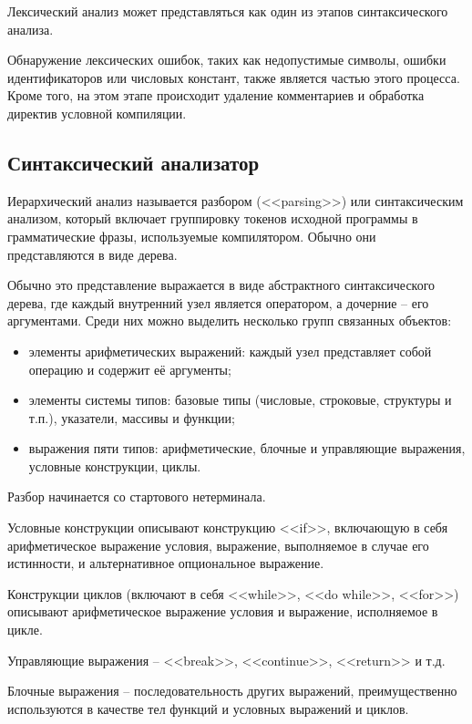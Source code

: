 Лексический анализ может представляться как один из этапов синтаксического анализа. 

Обнаружение лексических ошибок, таких как недопустимые символы, ошибки идентификаторов или числовых констант, также является частью этого процесса. Кроме того, на этом этапе происходит удаление комментариев и обработка директив условной компиляции. \\

\subsection{Синтаксический анализатор}
Иерархический анализ называется разбором (<<parsing>>) или синтаксическим анализом, который включает группировку токенов исходной программы в грамматические фразы, используемые компилятором. Обычно они представляются в виде дерева. 

Обычно это представление выражается в виде абстрактного синтаксического дерева, где каждый внутренний узел является оператором, а дочерние -- его аргументами. Среди них можно выделить несколько групп связанных объектов:
\begin{itemize}
	\item элементы арифметических выражений: каждый узел представляет собой операцию и содержит её аргументы;
	
	\item элементы системы типов: базовые типы (числовые, строковые, структуры и т.п.), указатели, массивы и функции;
	 
	\item выражения пяти типов: арифметические, блочные и управляющие выражения, условные конструкции, циклы.
\end{itemize}

Разбор начинается со стартового нетерминала. 

Условные конструкции описывают конструкцию <<if>>, включающую в себя арифметическое выражение условия, выражение, выполняемое в случае его истинности, и альтернативное опциональное выражение.

Конструкции циклов (включают в себя <<while>>, <<do while>>, <<for>>) описывают арифметическое выражение условия и выражение, исполняемое в цикле.

Управляющие выражения -- <<break>>, <<continue>>, <<return>> и т.д. 

Блочные выражения -- последовательность других выражений, преимущественно используются в качестве тел функций и условных выражений и циклов.

